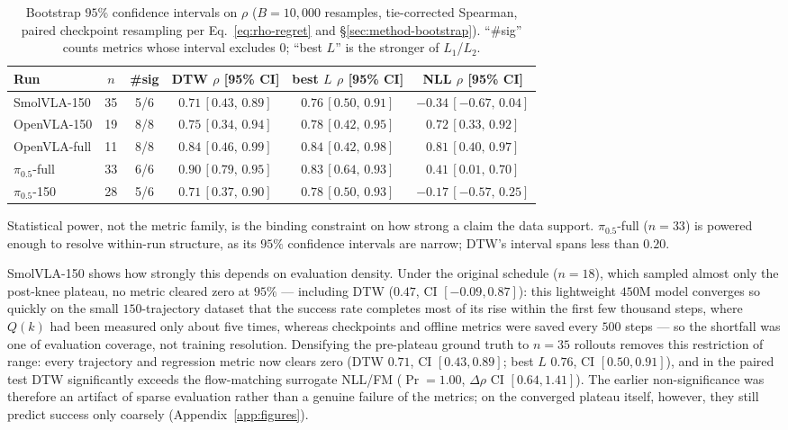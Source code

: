 \documentclass[english,12pt,a4paper,pdftex,elec,utf8]{aaltothesis}
\begin{document}
\begin{table}[h]
\centering
\caption{Bootstrap $95\%$ confidence intervals on $\rho$ ($B{=}10{,}000$ resamples, tie-corrected Spearman, paired checkpoint resampling per Eq.~\ref{eq:rho-regret} and \S\ref{sec:method-bootstrap}). ``\#sig''
counts metrics whose interval excludes $0$; ``best $L$'' is the stronger of $L_1$/$L_2$.}
\label{tab:bootstrap}
\begin{tabular}{lccccc}
\toprule
Run & $n$ & \#sig & DTW $\rho$ [95\% CI] & best $L$ $\rho$ [95\% CI] & NLL $\rho$ [95\% CI] \\
\midrule
SmolVLA-150      & 35 & 5/6 & $0.71\,[0.43,\,0.89]$ & $0.76\,[0.50,\,0.91]$ & $-0.34\,[-0.67,\,0.04]$ \\
OpenVLA-150      & 19 & 8/8 & $0.75\,[0.34,\,0.94]$  & $0.78\,[0.42,\,0.95]$  & $0.72\,[0.33,\,0.92]$ \\
OpenVLA-full     & 11 & 8/8 & $0.84\,[0.46,\,0.99]$  & $0.84\,[0.42,\,0.98]$  & $0.81\,[0.40,\,0.97]$ \\
$\pi_{0.5}$-full & 33 & 6/6 & $0.90\,[0.79,\,0.95]$  & $0.83\,[0.64,\,0.93]$  & $0.41\,[0.01,\,0.70]$ \\
$\pi_{0.5}$-150  & 28 & 5/6 & $0.71\,[0.37,\,0.90]$  & $0.78\,[0.50,\,0.93]$  & $-0.17\,[-0.57,\,0.25]$ \\
\bottomrule
\end{tabular}
\end{table}

Statistical power, not the metric family, is the binding constraint on how strong a claim the data support.
$\pi_{0.5}$-full ($n{=}33$) is powered enough to resolve within-run structure, as its $95\%$ confidence intervals are narrow; DTW's interval spans less than $0.20$.

SmolVLA-150 shows how strongly this depends on evaluation density. Under the original schedule ($n{=}18$), which sampled almost only the post-knee plateau, no metric cleared zero at $95\%$ --- including DTW ($0.47$, CI $[-0.09,0.87]$): this lightweight $450$M model converges so quickly on the small $150$-trajectory dataset that the success rate completes most of its rise within the first few thousand steps, where $Q(k)$ had been measured only about five times, whereas checkpoints and offline metrics were saved every $500$ steps --- so the shortfall was one of evaluation coverage, not training resolution. Densifying the pre-plateau ground truth to $n{=}35$ rollouts removes this restriction of range: every trajectory and regression metric now clears zero (DTW $0.71$, CI $[0.43,0.89]$; best $L$ $0.76$, CI $[0.50,0.91]$), and in the paired test DTW significantly exceeds the flow-matching surrogate NLL/FM ($\Pr{=}1.00$, $\Delta\rho$ CI $[0.64,1.41]$). The earlier non-significance was therefore an artifact of sparse evaluation rather than a genuine failure of the metrics; on the converged plateau itself, however, they still predict success only coarsely (Appendix~\ref{app:figures}).
\end{document}
